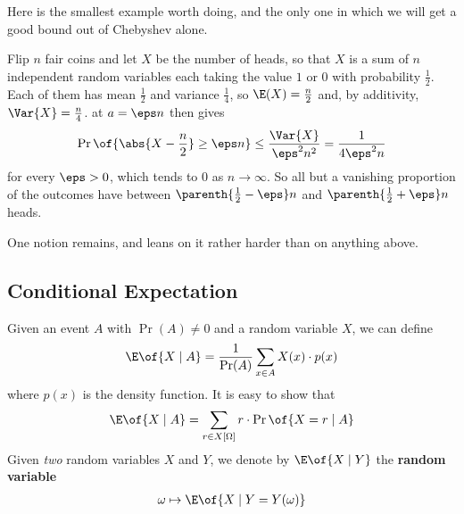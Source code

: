 Here is the smallest example worth doing, and the only one in which we will get a good bound out of Chebyshev alone.

\begin{boxexample}
    Flip $n$ fair coins and let $X$ be the number of heads, so that $X$ is a sum of $n$ independent random variables each taking the value $1$ or $0$ with probability $\frac{1}{2}$. Each of them has mean $\frac{1}{2}$ and variance $\frac{1}{4}$, so $\E(X) = \frac{n}{2}$ and, by additivity, $\Var{X} = \frac{n}{4}$.  at $a = \eps n$ then gives
    \begin{align*}
        \Pr\of{\abs{X - \frac{n}{2}} \geq \eps n} \leq \frac{\Var{X}}{\eps^2 n^2} = \frac{1}{4 \eps^2 n}
    \end{align*}
    for every $\eps > 0$, which tends to $0$ as $n \to \infty$. So all but a vanishing proportion of the outcomes have between $\parenth{\frac{1}{2} - \eps} n$ and $\parenth{\frac{1}{2} + \eps} n$ heads.
\end{boxexample}

One notion remains, and  leans on it rather harder than on anything above.

\subsection{Conditional Expectation}

Given an event $A$ with $\Pr(A) \neq 0$ and a random variable $X$, we can define
\begin{align*}
    \E\of{X \mid A} = \frac{1}{\Pr(A)} \sum_{x \in A} X(x) \cdot p(x)
\end{align*}
where $p(x)$ is the density function. It is easy to show that
\begin{align*}
    \E\of{X \mid A} = \sum_{r \in X[\Omega]} r \cdot \Pr\of{X = r \mid A}
\end{align*}
Given \textit{two} random variables $X$ and $Y$, we denote by $\E\of{X \mid Y}$ the \textbf{random variable}
\begin{align*}
    \omega \mapsto \E\of{X \mid Y = Y(\omega)}
\end{align*}

